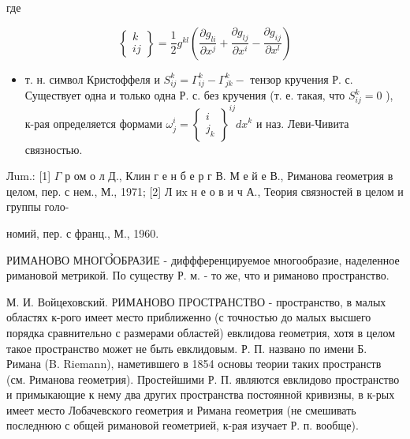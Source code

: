 \documentclass[10pt]{article}
\begin{document}
где



\[

\left\{\begin{array}{l}

k \\

i j

\end{array}\right\}=\frac{1}{2} g^{k l}\left(\frac{\partial g_{l i}}{\partial x^{j}}+\frac{\partial g_{l j}}{\partial x^{i}}-\frac{\partial g_{i j}}{\partial x^{l}}\right)

\]



\begin{itemize}

  \item т. н. символ Кристоффеля и $S_{i j}^{k}=\Gamma_{i j}^{k}-\Gamma_{j k}^{k}-$ тензор кручения Р. с. Существует одна и только одна Р. с. без кручения (т. е. такая, что $S_{i j}^{k}=0$ ), к-рая определяется формами $\omega_{j}^{i}=\left\{\begin{array}{c}i \\ j_{k}\end{array}\right\}^{i j} d x^{k}$ и наз. Леви-Чивита связностью.

\end{itemize}



Лum.: [1] $\Gamma$ р ом о л Д., Клин г е н б е р г В. М е й е В., Риманова геометрия в целом, пер. с нем., М., 1971; [2] Л и$\mathrm{x}$ н е о в и ч А., Теория связностей в целом и группы голо-

номий, пер. с франц., М., 1960.



РИМАНОВО МНОГО̉ОБРАЗИЕ - диффференцируемое многообразие, наделенное римановой метрикой. По существу Р. м. - то же, что и риманово пространство.



М. И. Войцеховский. РИМАНОВО ПРОСТРАНСТВО - пространство, в малых областях к-рого имеет место приближенно (с точностью до малых высшего порядка сравнительно с размерами областей) евклидова геометрия, хотя в целом такое пространство может не быть евклидовым. Р. П. названо по имени Б. Римана (B. Riemann), наметившего в 1854 основы теории таких пространств (см. Риманова геометрия). Простейшими Р. П. являются евклидово пространство и примыкающие к нему два других пространства постоянной кривизны, в к-рых имеет место Лобачевского геометрия и Римана геометрия (не смешивать последнюю с общей римановой геометрией, к-рая изучает Р. п. вообще).
\end{document}
